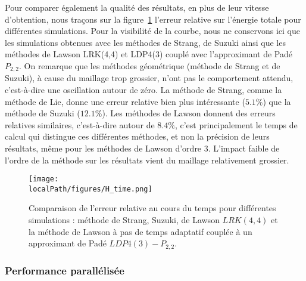 Pour comparer également la qualité des résultats, en plus de leur vitesse d'obtention, nous traçons sur la figure~\ref{fig:3:H_time} l'erreur relative sur l'énergie totale pour différentes simulations. Pour la visibilité de la courbe, nous ne conservons ici que les simulations obtenues avec les méthodes de Strang, de Suzuki ainsi que les méthodes de Lawson LRK(4,4) et LDP4(3) couplé avec l'approximant de Padé $P_{2,2}$. On remarque que les méthodes géométrique (méthode de Strang et de Suzuki), à cause du maillage trop grossier, n'ont pas le comportement attendu, c'est-à-dire une oscillation autour de zéro. La méthode de Strang, comme la méthode de Lie, donne une erreur relative bien plus intéressante ($5.1\%$) que la méthode de Suzuki ($12.1\%$). Les méthodes de Lawson donnent des erreurs relatives similaires, c'est-à-dire autour de $8.4\%$, c'est principalement le temps de calcul qui distingue ces différentes méthodes, et non la précision de leurs résultats, même pour les méthodes de Lawson d'ordre 3. L'impact faible de l'ordre de la méthode sur les résultats vient du maillage relativement grossier.

\begin{figure}
  \centering
  \texttt{[image: \\localPath/figures/H\_time.png]}
  \caption{Comparaison de l'erreur relative au cours du temps pour différentes simulations : méthode de Strang, Suzuki, de Lawson $LRK(4,4)$ et la méthode de Lawson à pas de temps adaptatif couplée à un approximant de Padé $LDP4(3)-P_{2,2}$.}
  \label{fig:3:H_time}
\end{figure}

\subsubsection{Performance parallélisée}


